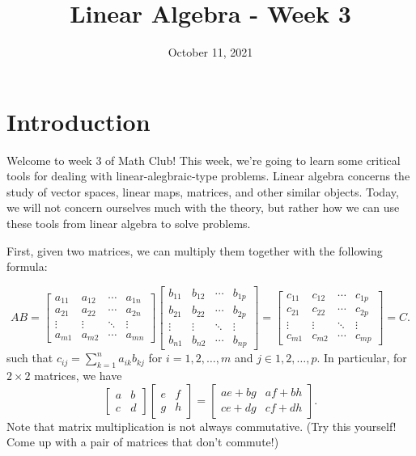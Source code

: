 \documentclass{article}
\title{Linear Algebra - Week 3}
\author{}
\date{October 11, 2021}
\begin{document}
\section{Introduction}

Welcome to week 3 of Math Club!
This week, we're going to learn some critical tools for dealing with linear-alegbraic-type problems.
Linear algebra concerns the study of vector spaces, linear maps, matrices, and other similar objects.
Today, we will not concern ourselves much with the theory, but rather how we can use these tools from linear algebra to solve problems.

First, given two matrices, we can multiply them together with the following formula:

\[AB = \begin{bmatrix}
a_{11}&a_{12}&\cdots&a_{1n}\\
a_{21}&a_{22}&\cdots&a_{2n}\\
\vdots&\vdots&\ddots&\vdots\\
a_{m1}&a_{m2}&\cdots&a_{mn}
\end{bmatrix}\begin{bmatrix}
b_{11}&b_{12}&\cdots&b_{1p}\\
b_{21}&b_{22}&\cdots&b_{2p}\\
\vdots&\vdots&\ddots&\vdots\\
b_{n1}&b_{n2}&\cdots&b_{np}
\end{bmatrix} = \begin{bmatrix}
c_{11}&c_{12}&\cdots&c_{1p}\\
c_{21}&c_{22}&\cdots&c_{2p}\\
\vdots&\vdots&\ddots&\vdots\\
c_{m1}&c_{m2}&\cdots&c_{mp}
\end{bmatrix} = C.
\]
such that $c_{ij} = \sum_{k = 1}^{n} a_{ik}b_{kj}$ for $i = 1, 2, \ldots, m$ and $j \in 1, 2, \ldots, p$.
In particular, for \(2\times 2\) matrices, we have
\[\begin{bmatrix}a&b\\c&d\end{bmatrix}\begin{bmatrix}e&f\\g&h\end{bmatrix} = \begin{bmatrix}ae+bg&af+bh\\ce+dg&cf+dh\end{bmatrix}.\]
Note that matrix multiplication is not always commutative. (Try this yourself! Come up with a pair of matrices that don't commute!)
\end{document}
